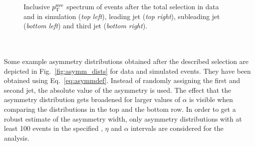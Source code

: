 \begin{figure}[!tp]
\begin{tabular}{cc}
  \end{tabular}
  \caption{Inclusive $p_{\text{T}}^\mathrm{ave}$ spectrum of events after the total selection in data and in simulation (\textit{top left}), leading jet \pt (\textit{top right}), subleading jet \pt (\textit{bottom left}) and third jet \pt (\textit{bottom right}).}
  \label{fig:ptave_spec}
\end{figure}
\\
\ \\
Some example asymmetry distributions obtained after the described selection are depicted in Fig.~\ref{fig:asymm_dists} for data and simulated events. They have been obtained using Eq.~\ref{eq:asymmdef}. Instead of randomly assigning the first and second jet, the absolute value of the asymmetry is used. The effect that the asymmetry distribution gets broadened for larger values of $\alpha$ is visible when comparing the distributions in the top and the bottom row. In order to get a robust estimate of the asymmetry width, only asymmetry distributions with at least 100 events in the specified \ptave, $\eta$ and $\alpha$ intervals are considered for the analysis. 
